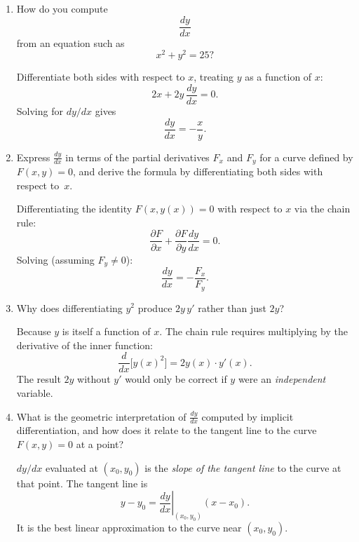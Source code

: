 \documentclass{essay}
\begin{document}
\begin{enumerate}[leftmargin=*, itemsep=8pt]
  \item How do you compute \[ \frac{dy}{dx} \] from an equation such
    as \[ x^2+y^2=25? \]

    \begin{answer} Differentiate both sides with respect to $x$,
      treating $y$ as a function of $x$:
      \[
        2x + 2y\,\frac{dy}{dx} = 0.
      \]
      Solving for $dy/dx$ gives
      \[
        \frac{dy}{dx} = -\frac{x}{y}.
      \]
    \end{answer}

  \item Express $\frac{dy}{dx}$ in terms of the partial derivatives
    $F_x$ and $F_y$ for a curve defined by $F(x,y)=0$, and derive the
    formula by differentiating both sides with respect to~$x$.

    \begin{answer} Differentiating the identity $F(x,y(x))=0$ with
      respect to $x$ via the chain rule:
      \[
        \frac{\partial F}{\partial x} + \frac{\partial F}{\partial
        y}\frac{dy}{dx} = 0.
      \]
      Solving (assuming $F_y\neq 0$):
      \[
        \frac{dy}{dx} = -\frac{F_x}{F_y}.
      \]
    \end{answer}

  \item Why does differentiating \(y^2\) produce \(2y\,y'\) rather
    than just \(2y\)?

    \begin{answer} Because $y$ is itself a function of $x$.  The
      chain rule requires multiplying by the derivative of the inner function:
      \[
        \frac{d}{dx}\bigl[y(x)^2\bigr] = 2y(x)\cdot y'(x).
      \]
      The result $2y$ without $y'$ would only be correct if $y$ were an
      \emph{independent} variable.
    \end{answer}

  \item What is the geometric interpretation of $\frac{dy}{dx}$
    computed by implicit differentiation, and how does it relate to
    the tangent line to the curve $F(x,y)=0$ at a point?

    \begin{answer} $dy/dx$ evaluated at $(x_0,y_0)$ is the
      \emph{slope of the tangent line} to the curve at that point.  The
      tangent line is
      \[
        y - y_0 = \left.\frac{dy}{dx}\right|_{(x_0,y_0)}(x-x_0).
      \]
      It is the best linear approximation to the curve near $(x_0,y_0)$.
    \end{answer}


\end{enumerate}
\end{document}

